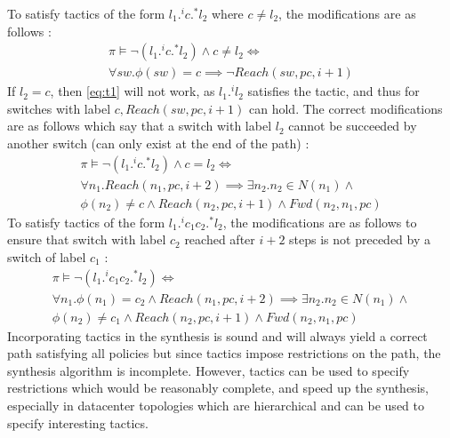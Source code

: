 To satisfy tactics of the form $l_1  .^i c .^* l_2$ where $c \not= l_2$, the modifications are as follows :
\begin{multline} \label{eq:t1}
\pi \vDash \neg (l_1 .^i c .^* l_2) \wedge c \not= l_2 \Leftrightarrow \\ \forall sw. \phi(sw) = c \implies \neg Reach(sw, pc, i + 1)
\end{multline}
If $l_2 = c$, then \cref{eq:t1} will not work, as $l_1 .^i l_2$ satisfies the tactic, and thus for switches with label $c,Reach(sw,pc,i+1)$ can hold. The correct modifications are as follows which say that a switch with label $l_2$ cannot be succeeded by another switch (can only exist at the end of the path) : 
\begin{multline} \label{eq:t2}
 \pi \vDash \neg (l_1 .^i c .^* l_2) \wedge c = l_2 \Leftrightarrow \\ 
 \forall n_1. Reach(n_1,pc,i + 2) \implies \exists n_2.  n_2 \in N(n_1) \wedge \\ \phi(n_2) \not= c \wedge 
 Reach(n_2,pc,i+1) \wedge Fwd(n_2,n_1,pc)
\end{multline}
To satisfy tactics of the form $l_1  .^i c_1 c_2 .^* l_2$, the modifications are as follows to ensure that switch with label $c_2$ reached after $i + 2$ steps is not preceded by a switch of label $c_1$ : 
\begin{multline} \label{eq:t3}
\pi \vDash \neg (l_1 .^i c_1 c_2 .^* l_2) \Leftrightarrow \\ 
\forall n_1. \phi(n_1) = c_2 \wedge Reach(n_1,pc,i + 2) \implies \exists n_2.  n_2 \in N(n_1) \wedge \\ \phi(n_2) \not= c_1 \wedge 
Reach(n_2,pc,i+1) \wedge Fwd(n_2,n_1,pc)
\end{multline}
Incorporating tactics in the synthesis is sound and will always yield a correct path satisfying all policies but since tactics impose restrictions on the path, the synthesis algorithm is incomplete. However, tactics can be used to specify restrictions which would be reasonably complete, and speed up the synthesis, especially in datacenter topologies which are hierarchical and can be used to specify interesting tactics. 


